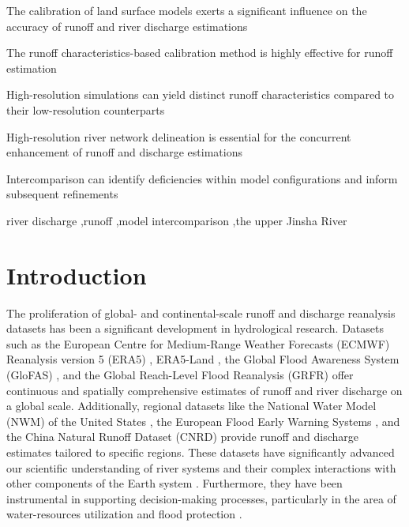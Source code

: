 \documentclass[preprint, review, authoryear, longtitle, 12pt, 3p]{elsarticle}
\begin{document}
\begin{frontmatter}
  \begin{highlights}
  \item The calibration of land surface models exerts a significant influence on the accuracy of runoff and river discharge estimations
  \item The runoff characteristics-based calibration method is highly effective for runoff estimation
  \item High-resolution simulations can yield distinct runoff characteristics compared to their low-resolution counterparts
  \item High-resolution river network delineation is essential for the concurrent enhancement of runoff and discharge estimations
  \item Intercomparison can identify deficiencies within model configurations and inform subsequent refinements
  \end{highlights}

  \begin{keyword}
    river discharge \sep runoff \sep model intercomparison \sep the upper Jinsha River
  \end{keyword}
\end{frontmatter}

\section{Introduction}

The proliferation of global- and continental-scale runoff and discharge reanalysis datasets has been a significant development in hydrological research. Datasets such as the European Centre for Medium-Range Weather Forecasts (ECMWF) Reanalysis version 5 (ERA5) \citep{hersbach2020QJMRS}, ERA5-Land \citep{munoz-sabater2021ESSD}, the Global Flood Awareness System (GloFAS) \citep{alfieri2020JH, harrigan2020ESSD}, and the Global Reach-Level Flood Reanalysis (GRFR) \citep{yang2021BAMS, lin2019WRR} offer continuous and spatially comprehensive estimates of runoff and river discharge on a global scale. Additionally, regional datasets like the National Water Model (NWM) of the United States \citep{cosgrove2024JAWRA}, the European Flood Early Warning Systems \citep{najafi2024NC}, and the China Natural Runoff Dataset (CNRD) \citep{gou2021BAMS, miao2022CSB} provide runoff and discharge estimates tailored to specific regions. These datasets have significantly advanced our scientific understanding of river systems \citep{feng2021NC, collins2024NG} and their complex interactions with other components of the Earth system \citep{liu2024NG}. Furthermore, they have been instrumental in supporting decision-making processes, particularly in the area of water-resources utilization and flood protection \citep{cosgrove2024JAWRA, coughlan_de_perez2016HESS}.
\end{document}
